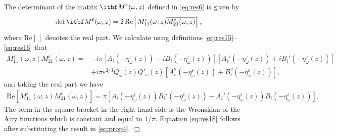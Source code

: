 \documentclass[final]{siamltex}
\begin{document}
The determinant of the matrix ${{\itbf M}}^{\varepsilon}({\omega},z)$ defined in \eqref{eq:res6} is given by
\begin{equation}
\det {{\itbf M}}^{\varepsilon}({\omega},z) = 2 \, \mbox{Re} \left[ M_{11}^{\varepsilon}({\omega},z)
  \overline{M_{21}^{\varepsilon}({\omega},z)} \right],
\label{eq:prop4}
\end{equation}
where $\mbox{Re}[~ ]$ denotes the real part. We calculate using
definitions \eqref{eq:res15}--\eqref{eq:res16} that
\begin{align*}
 M_{11}^{\varepsilon}({\omega},z) \overline{M_{21}^{\varepsilon}({\omega},z)} =& - i \pi
 \left[A_i(-\eta_{\omega}^{\varepsilon}(z))-iB_i(-\eta_{\omega}^{\varepsilon}(z))\right]
 \left[A_i'(-\eta_{\omega}^{\varepsilon}(z))+iB_i'(-\eta_{\omega}^{\varepsilon}(z))\right] \nonumber
 \\ &+ i \pi {\varepsilon}^{2/3} Q_{\omega}(z) Q'_{\omega}(z) \left[A_i^2(-\eta_{\omega}^{\varepsilon}(z))
   + B^2_i(-\eta_{\omega}^{\varepsilon}(z))\right],
\end{align*}
and taking the real part we have 
\begin{align*}
\mbox{Re} \left[ M_{11}^{\varepsilon}({\omega},z) \overline{M_{21}^{\varepsilon}({\omega},z)}
  \right] = \pi \left[A_i(-\eta_{\omega}^{\varepsilon}(z)) B_i'(-\eta_{\omega}^{\varepsilon}(z)) - 
A_i'(-\eta_{\omega}^{\varepsilon}(z)) B_i(-\eta_{\omega}^{\varepsilon}(z))\right].
\end{align*}
The term in the square bracket in the right-hand side is the Wronskian of
the Airy functions which is constant and equal to $1/\pi$. Equation
\eqref{eq:res18} follows after substituting the result in \eqref{eq:prop4}. 
$\Box$
\end{document}
